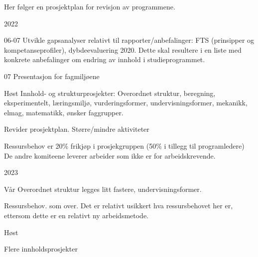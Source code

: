 Her følger en prosjektplan for revisjon av programmene.

2022 

06-07 Utvikle gapsanalyser relativt til rapporter/anbefalinger: FTS (prinsipper og kompetanseprofiler), dybdeevaluering 2020. Dette skal resultere i en liste med konkrete anbefalinger om endring av innhold i studieprogrammet.  

07 Presentasjon for fagmiljøene

Høst Innhold- og strukturprosjekter: Overordnet struktur, beregning, eksperimentelt, læringsmiljø, vurderingsformer, undervisningsformer, mekanikk, elmag, matematikk, ønsker faggrupper.

Revider prosjektplan. Større/mindre aktiviteter

Ressursbehov er 20\% frikjøp i prosjekgruppen (50\% i tillegg til programledere) De andre komiteene leverer arbeider som ikke er for arbeidskrevende. 

2023 

Vår Overordnet struktur legges litt fastere, undervisningsformer.

Ressursbehov. som over. Det er relativt usikkert hva ressursbehovet her er, ettersom dette er en relativt ny arbeidsmetode.


Høst

Flere innholdsprosjekter


